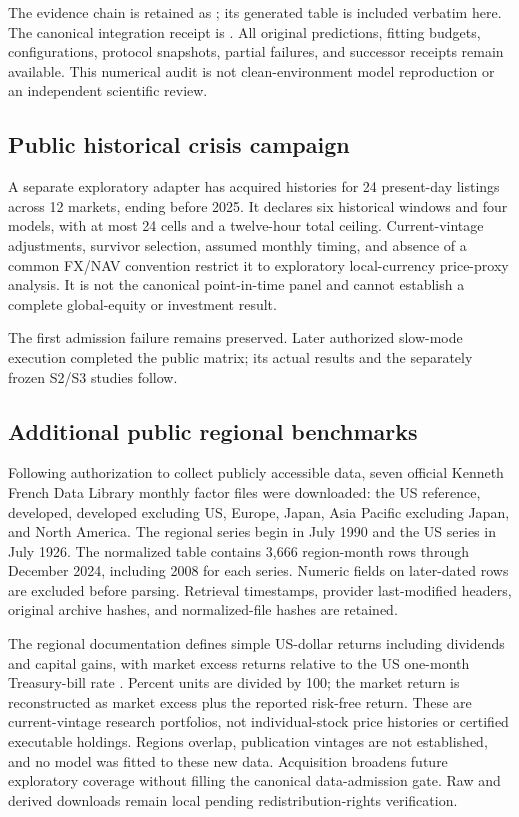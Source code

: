 \documentclass[11pt,a4paper]{article}
\begin{document}
The evidence chain is retained as ; its generated table is included verbatim here. The canonical integration receipt is . All original predictions, fitting budgets, configurations, protocol snapshots, partial failures, and successor receipts remain available. This numerical audit is not clean-environment model reproduction or an independent scientific review.

\subsection{Public historical crisis campaign}
A separate exploratory adapter has acquired histories for 24 present-day listings across 12 markets, ending before 2025. It declares six historical windows and four models, with at most 24 cells and a twelve-hour total ceiling. Current-vintage adjustments, survivor selection, assumed monthly timing, and absence of a common FX/NAV convention restrict it to exploratory local-currency price-proxy analysis. It is not the canonical point-in-time panel and cannot establish a complete global-equity or investment result.

The first admission failure remains preserved. Later authorized slow-mode execution completed the public matrix; its actual results and the separately frozen S2/S3 studies follow.



\subsection{Additional public regional benchmarks}
Following authorization to collect publicly accessible data, seven official Kenneth French Data Library monthly factor files were downloaded: the US reference, developed, developed excluding US, Europe, Japan, Asia Pacific excluding Japan, and North America. The regional series begin in July 1990 and the US series in July 1926. The normalized table contains 3,666 region-month rows through December 2024, including 2008 for each series. Numeric fields on later-dated rows are excluded before parsing. Retrieval timestamps, provider last-modified headers, original archive hashes, and normalized-file hashes are retained.

The regional documentation defines simple US-dollar returns including dividends and capital gains, with market excess returns relative to the US one-month Treasury-bill rate \citep{frenchlibrary}. Percent units are divided by 100; the market return is reconstructed as market excess plus the reported risk-free return. These are current-vintage research portfolios, not individual-stock price histories or certified executable holdings. Regions overlap, publication vintages are not established, and no model was fitted to these new data. Acquisition broadens future exploratory coverage without filling the canonical data-admission gate. Raw and derived downloads remain local pending redistribution-rights verification.
\end{document}
